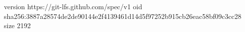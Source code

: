 version https://git-lfs.github.com/spec/v1
oid sha256:3887a28574de2de90144e2f4139461d14d5f97252b915cb26eac58bf09c3cc28
size 2192
